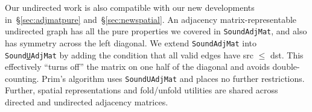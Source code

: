 Our undirected work is also compatible with our new developments
in~\S\ref{sec:adjmatpure} and~\S\ref{sec:newspatial}.
An adjacency matrix-representable undirected graph
has all the pure properties we covered in \texttt{SoundAdjMat},
and also has symmetry across the left diagonal.
We extend \texttt{SoundAdjMat} into
\texttt{Sound{\underline{U}}AdjMat} by adding the condition that
all valid edges have src $\le$ dst. This effectively ``turns off'' the
matrix on one half of the diagonal and avoids double-counting. Prim's algorithm uses
\texttt{SoundUAdjMat} and places no further restrictions.
Further, spatial representations and fold/unfold utilities are shared
across directed and undirected adjacency matrices.


\lstset{style=myTinyStyle}


